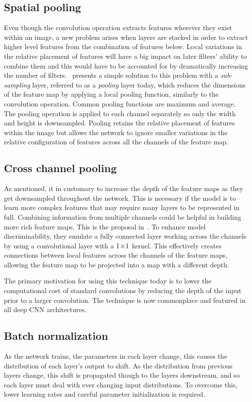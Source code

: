 \subsection{Spatial pooling}
Even though the convolution operation extracts features wherever they exist within an image, a new problem arises when layers are stacked in order to extract higher level features from the combination of features below.
Local variations in the relative placement of features will have a big impact on later filters' ability to combine them and this would have to be accounted for by dramatically increasing the number of filters.\ \textcite{lecun1998gradient} presents a simple solution to this problem with a \textit{sub-sampling} layer, referred to as a \textit{pooling} layer today, which reduces the dimensions of the feature map by applying a local pooling function, similarly to the convolution operation.
Common pooling functions are maximum and average.
The pooling operation is applied to each channel separately so only the width and height is downsampled.
Pooling retains the relative placement of features within the image but allows the network to ignore smaller variations in the relative configuration of features across all the channels of the feature map.

\subsection{Cross channel pooling}
As mentioned, it in customary to increase the depth of the feature maps as they get downsampled throughout the network.
This is necessary if the model is to learn more complex features that may require many layers to be represented in full.
Combining information from multiple channels could be helpful in building more rich feature maps.
This is the proposal in\ \textcite{lin2014network}.
To enhance model discriminability, they emulate a fully connected layer working across the channels by using a convolutional layer with a \(1\!\times \! 1\) kernel.
This effectively creates connections between local features across the channels of the feature maps, allowing the feature map to be projected into a map with a different depth.

The primary motivation for using this technique today is to lower the computational cost of standard convolutions by reducing the depth of the input prior to a larger convolution.
The technique is now commonplace and featured in all deep CNN architectures.

\subsection{Batch normalization}
As the network trains, the parameters in each layer change, this causes the distribution of each layer’s output to shift.
As the distribution from previous layers change, this shift is propagated though to the layers downstream, and so each layer must deal with ever changing input distributions.
To overcome this, lower learning rates and careful parameter initialization is required.

